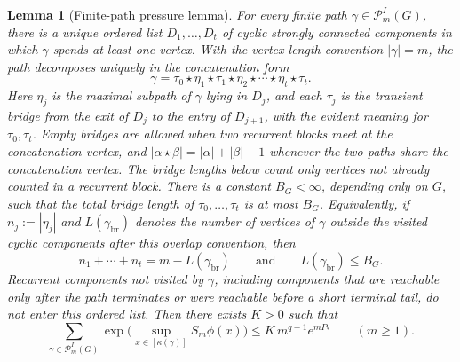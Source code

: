 \documentclass{etds}%
\numberwithin{equation}{section}
\theoremstyle{plain}
\newtheorem{lemma}[theorem]{Lemma}
\theoremstyle{definition}
\theoremstyle{remark}
\begin{document}
\begin{lemma}[Finite-path pressure lemma]
For every finite path $\gamma\in\mathcal{P}_m^I(G)$, there is a unique ordered
list $D_1,\dots,D_t$ of cyclic strongly connected components in which
$\gamma$ spends at least one vertex.  With the vertex-length convention
$|\gamma|=m$, the path decomposes uniquely in the concatenation form
\[
\gamma
=\tau_0\star\eta_1\star\tau_1\star\eta_2
\star\cdots\star\eta_t\star\tau_t.
\]
Here $\eta_j$ is the maximal subpath of $\gamma$ lying in $D_j$, and each
  $\tau_j$ is the transient bridge from the exit of $D_j$ to the entry of
$D_{j+1}$, with the evident meaning for $\tau_0,\tau_t$.  Empty bridges are
allowed when two recurrent blocks meet at the concatenation vertex, and
$|\alpha\star\beta|=|\alpha|+|\beta|-1$ whenever the two paths share the
concatenation vertex.  The bridge lengths below count only vertices not
already counted in a recurrent block.  There is a constant $B_G<\infty$,
depending only on $G$, such that the total bridge length of
$\tau_0,\dots,\tau_t$ is at most $B_G$.  Equivalently, if
$n_j:=|\eta_j|$ and $L(\gamma_{\mathrm{br}})$ denotes the number of vertices
of $\gamma$ outside the visited cyclic components after this overlap
convention, then
\[
n_1+\cdots+n_t=m-L(\gamma_{\mathrm{br}})
\qquad\text{and}\qquad
L(\gamma_{\mathrm{br}})\le B_G.
\]
Recurrent components not visited by $\gamma$, including components that are
reachable only after the path terminates or were reachable before a short
terminal tail, do not enter this ordered list.
Then there exists $K>0$ such that
\[
\sum_{\gamma\in\mathcal{P}_m^I(G)}
\exp\!\bigl(\sup_{x\in[\kappa(\gamma)]}S_m\phi(x)\bigr)
\le K\,m^{q-1}e^{mP_*}
\qquad(m\ge 1).
\]
\end{lemma}
\end{document}
